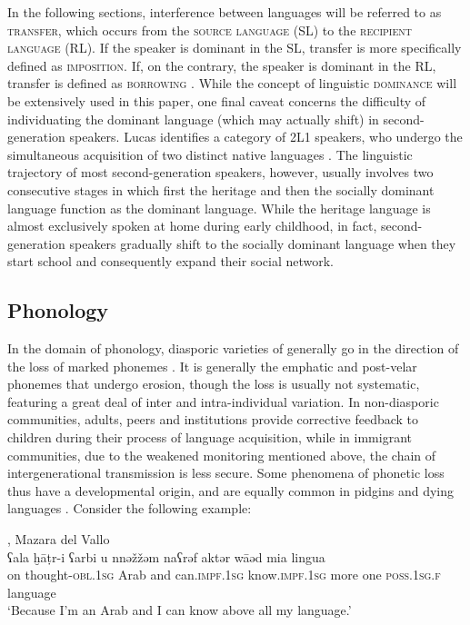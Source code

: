 \documentclass[output=paper]{langsci/langscibook}
\begin{document}
In the following sections, interference between languages will be referred to as \textsc{transfer}, which occurs from the \textsc{source} \textsc{language} ({SL}) to the \textsc{recipient} \textsc{language} ({RL}). If the speaker is dominant in the {SL}, {transfer} is more specifically defined as \textsc{imposition}. If, on the contrary, the speaker is dominant in the {RL}, {transfer} is defined as \textsc{borrowing} \citep{VanCoetsem1988, VanCoetsem2000,Lucas2015}. While the concept of linguistic \textsc{dominance} will be extensively used in this paper, one final caveat concerns the difficulty of individuating the dominant language (which may actually shift) in second-generation speakers. Lucas identifies a category of 2L1 speakers, who undergo the simultaneous acquisition of two distinct native languages \citep[525]{Lucas2015}. The linguistic trajectory of most second-generation speakers, however, usually involves two consecutive stages in which first the heritage and then the socially dominant language function as the dominant language. While the heritage language is almost exclusively spoken at home during early childhood, in fact, second-generation speakers gradually shift to the socially dominant language when they start school and consequently expand their social network.


 
 \subsection{Phonology}


In the domain of phonology, diasporic varieties of  generally go in the direction of the loss of marked phonemes \citep[293]{Versteegh2014book}. It is generally the {emphatic} and post-velar phonemes that undergo erosion, though the loss is usually not systematic, featuring a great deal of inter and intra-individual variation. In non-diasporic communities, adults, peers and institutions provide corrective feedback to children during their process of language acquisition, while in immigrant communities, due to the weakened monitoring mentioned above, the chain of intergenerational {transmission} is less secure. Some phenomena of phonetic loss thus have a developmental origin, and are equally common in pidgins and dying languages \citep[372–373]{Romaine1989}. Consider the following example:

\ea\label{maz}
{ , {Mazara del Vallo} \citep[85]{Danna2017book}}\\
\gll ʕala ḫāṭr-i ʕarbi u nnəžžəm naʕrəf aktər wāəd mia lingua\\
     on thought-\textsc{obl.1sg} Arab and can.\textsc{impf.1sg} know.\textsc{impf.1sg} more one \textsc{poss.1sg.f} language\\
\glt `Because I’m an Arab and I can know above all my language.'
\z
\end{document}
